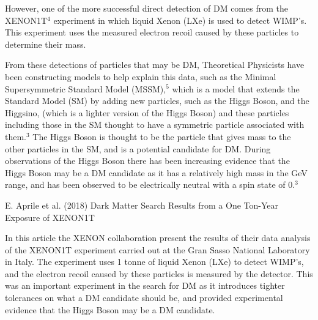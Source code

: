 \documentclass[]{article}
\begin{document}
\par
However, one of the more successful direct detection of DM comes from the 
XENON1T$^4$ experiment in which liquid Xenon (LXe) is used to detect WIMP's.
This experiment uses the measured electron recoil caused by these particles
to determine their mass. 
\par
From these detections of particles that may be DM, Theoretical Physicists have
been constructing models to help explain this data, such as the Minimal Supersymmetric
Standard Model (MSSM),$^5$ which is a model that extends the Standard Model (SM) by
adding new particles, such as the Higgs Boson, and the Higgsino, (which is a
lighter version of the Higgs Boson) and these particles including those in the SM 
thought to have a symmetric particle associated with them.$^3$ The Higgs Boson is thought to be the particle
that gives mass to the other particles in the SM, and is a potential 
candidate for DM. During observations of the Higgs Boson there has been increasing
evidence that the Higgs Boson may be a DM candidate
as it has a relatively high mass in the GeV range, and has been observed
to be electrically neutral with a spin state of 0.$^3$
\par
\newpage
\noindent 
 [4] E. Aprile et al. (2018) Dark Matter Search Results from a One Ton-Year Exposure of XENON1T
\par
In this article the XENON collaboration present the results of their data analysis
of the XENON1T experiment carried out at the Gran Sasso National Laboratory in Italy.
The experiment uses  1 tonne of liquid Xenon (LXe) to detect WIMP's, and the 
electron recoil caused by these particles is measured by the detector. This was an 
important experiment in the search for DM as it introduces tighter tolerances on what 
a DM candidate should be, and provided experimental evidence that the Higgs Boson
may be a DM candidate.\parskip 0.2cm
\end{document}
